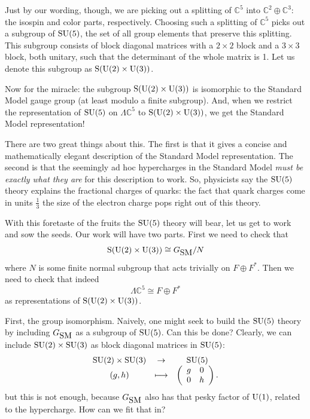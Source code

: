 \documentclass{article}
\newcommand{\C}{{\mathbb C}}  %
\newcommand{\U}{{\rm U}}    %
\renewcommand{\S}{{\rm S}}    %
\newcommand{\SU}{{\rm SU}}    %
\newcommand{\Ex}{\Lambda} %
\newcommand{\iso}{\cong} %
\newcommand{\third}{\frac{1}{3}} %
\newcommand{\GSM}{{G_{\mbox{\rm SM}}}}  %
\begin{document}
Just by our wording, though, we are picking out a splitting of $\C^5$
into $\C^2 \oplus \C^3$: the isospin and color parts,
respectively. Choosing such a splitting of $\C^5$ picks out a subgroup
of $\SU(5)$, the set of all group elements that preserve this
splitting.  This subgroup consists of block diagonal matrices with a $2
\times 2$ block and a $3 \times 3$ block, both unitary, such that the
determinant of the whole matrix is 1.  Let us denote this subgroup as
$\S(\U(2) \times \U(3))$.

Now for the miracle: the subgroup $\S(\U(2) \times \U(3))$ is isomorphic
to the Standard Model gauge group (at least modulo a finite subgroup).
And, when we restrict the representation of $\SU(5)$ on $\Ex
\C^5$ to $\S(\U(2) \times \U(3))$, we get the Standard Model representation!

There are two great things about this.  The first is that it gives a
concise and mathematically elegant description of the Standard Model
representation.  The second is that the seemingly ad hoc hypercharges
in the Standard Model \emph{must be exactly what they are} for this
description to work.  So, physicists say the $\SU(5)$ theory explains
the fractional charges of quarks: the fact that quark charges come in
units $\third$ the size of the electron charge pops right out of this
theory.

With this foretaste of the fruits the $\SU(5)$ theory will bear, let
us get to work and sow the seeds.  Our work will have two
parts.  First we need to check that
\[ \S(\U(2) \times \U(3)) \iso \GSM/N \]
where $N$ is some finite normal subgroup that acts trivially on 
$F \oplus F^*$.  Then we need to check that indeed
\[ \Ex \C^5 \iso F \oplus F^* \]
as representations of $\S(\U(2) \times \U(3))$. 

First, the group isomorphism.  Naively, one might seek to build
the $\SU(5)$ theory by including $\GSM$ as a subgroup of $\SU(5)$. 
Can this be done?
Clearly, we can include $\SU(2) \times \SU(3)$ as block diagonal 
matrices in $\SU(5)$:
\[ \begin{array}{ccc}
   \SU(2) \times \SU(3) &\to& \SU(5) \\
   (g, h) &\longmapsto& 
\left( 
\begin{array}{cc}
g & 0 \\
0 & h
\end{array}
\right).
\end{array}
\]
but this is not enough, because $\GSM$ also has that pesky factor of
$\U(1)$, related to the hypercharge.  How can we fit that in?
\end{document}
